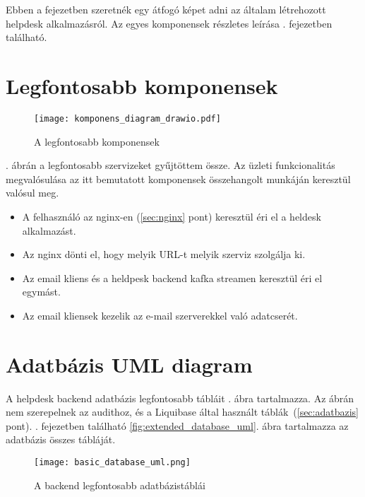Ebben a fejezetben szeretnék egy átfogó képet adni az általam létrehozott helpdesk alkalmazásról. Az egyes komponensek részletes leírása . fejezetben található.

\section{Legfontosabb komponensek}

\begin{figure}[hbt] 
	\centering
	\texttt{[image: komponens\_diagram\_drawio.pdf]}
	\caption{A legfontosabb komponensek}
	\label{fig:komponens_diagram}
\end{figure}

. ábrán a legfontosabb szervizeket gyűjtöttem össze. Az üzleti funkcionalitás megvalósulása az itt bemutatott komponensek összehangolt munkáján keresztül valósul meg.



\begin{itemize}
	\item A felhasználó az nginx-en (\ref{sec:nginx} pont) keresztül éri el a heldesk alkalmazást.
	\item Az nginx dönti el, hogy melyik URL-t melyik szerviz szolgálja ki.
	\item Az email kliens és a heldpesk backend kafka streamen keresztül éri el egymást.
	\item Az email kliensek kezelik az e-mail szerverekkel való adatcserét.
\end{itemize}


\section{Adatbázis UML diagram}
A helpdesk backend adatbázis legfontosabb tábláit . ábra tartalmazza. Az ábrán nem szerepelnek az audithoz, és a Liquibase által használt táblák~(\ref{sec:adatbazis} pont). . fejezetben található \ref{fig:extended_database_uml}. ábra tartalmazza az adatbázis összes tábláját.
 


\begin{figure}[hbt] 
	\centering
	\texttt{[image: basic\_database\_uml.png]}
	\caption{A backend legfontosabb adatbázistáblái}
	\label{fig:basic_database_uml}
\end{figure}

